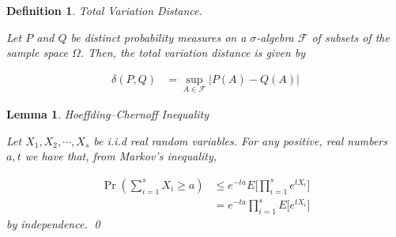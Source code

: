 \documentclass[11pt]{article}
\newcommand\0{\mathbf{0}}
\newcommand\<{\langle}
\renewcommand\>{\rangle}
\newtheorem{lemma}[theorem]{Lemma}
\newtheorem{definition}[theorem]{Definition}
\begin{document}
\begin{definition} Total Variation Distance.
\label{def:tve}

Let $P$ and $Q$ be distinct probability measures on a $\sigma$-algebra $\mathcal{F}$ of subsets of the sample space $\Omega$. Then, the total variation distance is given by

\begin{align*}
\delta(P, Q) &= \sup_{A \in \mathcal{F}}\vert P(A) - Q(A)\vert
\end{align*}
\end{definition}

\begin{lemma}Hoeffding--Chernoff Inequality
\label{lem:chernoff}

Let $X_1, X_2, \cdots, X_s$	be i.i.d real random variables. For any positive, real numbers $a, t$ we have that, from Markov's inequality,

\begin{align*}
\Pr(\sum_{i=1}^s X_i \geq a) &\leq e^{-ta} E\Bigg[\prod_{i=1}^s e^{tX_i}\Bigg]\\
&= e^{-ta} \prod_{i=1}^s E\Bigg[e^{tX_i}\Bigg]
\end{align*}
by independence.
\qed
\end{lemma}
\end{document}
